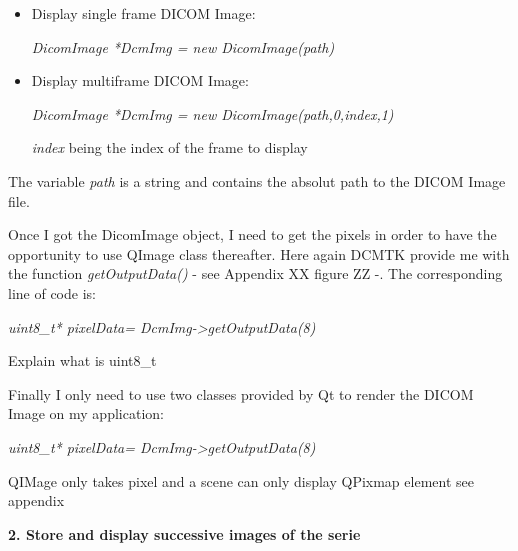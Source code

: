 \begin{itemize}
	\item Display single frame DICOM Image:
	
	\begin{center}
	\textit{DicomImage *DcmImg = new DicomImage(path)}
	\end{center}
	
	
	\item Display multiframe DICOM Image:
	
	\begin{center}
	\textit{DicomImage *DcmImg = new DicomImage(path,0,index,1)}
	\end{center}
	
	\textit{index} being the index of the frame to display
	
\end{itemize}

The variable \textit{path} is a string and contains the absolut path to the DICOM Image file.
\newline \vspace{5mm}


Once I got the DicomImage object, I need to get the pixels in order to have the opportunity to use QImage class thereafter. Here again DCMTK provide me with the function \textit{getOutputData()} - see Appendix XX figure ZZ -. The corresponding line of code is:
\newline \vspace{5mm} 

	\begin{center}
	\textit{uint8_t* pixelData= DcmImg->getOutputData(8)}
	\end{center}

\newline \vspace{5mm}  
Explain what is uint8_t



Finally I only need to use two classes provided by Qt to render the DICOM Image on my application:

\newline \vspace{5mm} 

	\begin{center}
	\textit{uint8_t* pixelData= DcmImg->getOutputData(8)}
	\end{center}

\newline \vspace{5mm}  

QIMage only takes pixel and a scene can only display QPixmap element see appendix


\newline \vspace{5mm}	

\textbf{2. Store and display successive images of the serie}

\newline \vspace{5mm}	




